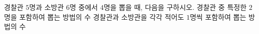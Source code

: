 경찰관 $5$명과 소방관 $6$명 중에서 $4$명을 뽑을 때, 다음을 구하시오.
 경찰관 중 특정한 $2$명을 포함하여 뽑는 방법의 수
 경찰관과 소방관을 각각 적어도 $1$명씩 포함하여 뽑는 방법의 수
